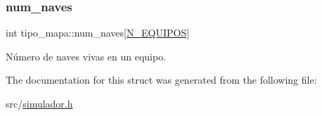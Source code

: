 \mbox{\label{structtipo__mapa_a5a59bf5262122191c18e3a94eae24a8c}} 
\subsubsection{\texorpdfstring{num\+\_\+naves}{num\_naves}}
{\footnotesize\ttfamily int tipo\+\_\+mapa\+::num\+\_\+naves\mbox{[}\hyperlink{simulador_8h_ab306668933fb4316ac0f5ef291d13dff}{N\+\_\+\+E\+Q\+U\+I\+P\+OS}\mbox{]}}



Número de naves vivas en un equipo. 



The documentation for this struct was generated from the following file\+:\begin{DoxyCompactItemize}
\item 
src/\hyperlink{simulador_8h}{simulador.\+h}\end{DoxyCompactItemize}

